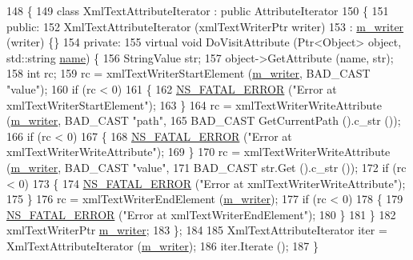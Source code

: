 \begin{DoxyCode}
148 \{
149   \textcolor{keyword}{class }XmlTextAttributeIterator : \textcolor{keyword}{public} AttributeIterator
150   \{
151 \textcolor{keyword}{public}:
152     XmlTextAttributeIterator (xmlTextWriterPtr writer)
153       : \hyperlink{classns3_1_1XmlConfigSave_a838ec47c15d124d23133a8e633c40397}{m\_writer} (writer) \{\}
154 \textcolor{keyword}{private}:
155     \textcolor{keyword}{virtual} \textcolor{keywordtype}{void} DoVisitAttribute (Ptr<Object> \textcolor{keywordtype}{object}, std::string \hyperlink{generate__test__data__lte__spectrum__model_8m_ab74e6bf80237ddc4109968cedc58c151}{name}) \{
156       StringValue str;
157       \textcolor{keywordtype}{object}->GetAttribute (name, str);
158       \textcolor{keywordtype}{int} rc;
159       rc = xmlTextWriterStartElement (\hyperlink{classns3_1_1XmlConfigSave_a838ec47c15d124d23133a8e633c40397}{m\_writer}, BAD\_CAST \textcolor{stringliteral}{"value"});
160       \textcolor{keywordflow}{if} (rc < 0) 
161         \{
162           \hyperlink{group__fatal_ga5131d5e3f75d7d4cbfd706ac456fdc85}{NS\_FATAL\_ERROR} (\textcolor{stringliteral}{"Error at xmlTextWriterStartElement"});
163         \}
164       rc = xmlTextWriterWriteAttribute (\hyperlink{classns3_1_1XmlConfigSave_a838ec47c15d124d23133a8e633c40397}{m\_writer}, BAD\_CAST \textcolor{stringliteral}{"path"},
165                                         BAD\_CAST GetCurrentPath ().c\_str ());
166       \textcolor{keywordflow}{if} (rc < 0) 
167         \{
168           \hyperlink{group__fatal_ga5131d5e3f75d7d4cbfd706ac456fdc85}{NS\_FATAL\_ERROR} (\textcolor{stringliteral}{"Error at xmlTextWriterWriteAttribute"});
169         \}
170       rc = xmlTextWriterWriteAttribute (\hyperlink{classns3_1_1XmlConfigSave_a838ec47c15d124d23133a8e633c40397}{m\_writer}, BAD\_CAST \textcolor{stringliteral}{"value"},
171                                         BAD\_CAST str.Get ().c\_str ());
172       \textcolor{keywordflow}{if} (rc < 0) 
173         \{
174           \hyperlink{group__fatal_ga5131d5e3f75d7d4cbfd706ac456fdc85}{NS\_FATAL\_ERROR} (\textcolor{stringliteral}{"Error at xmlTextWriterWriteAttribute"});
175         \}
176       rc = xmlTextWriterEndElement (\hyperlink{classns3_1_1XmlConfigSave_a838ec47c15d124d23133a8e633c40397}{m\_writer});
177       \textcolor{keywordflow}{if} (rc < 0) 
178         \{
179           \hyperlink{group__fatal_ga5131d5e3f75d7d4cbfd706ac456fdc85}{NS\_FATAL\_ERROR} (\textcolor{stringliteral}{"Error at xmlTextWriterEndElement"});
180         \}
181     \}
182     xmlTextWriterPtr \hyperlink{classns3_1_1XmlConfigSave_a838ec47c15d124d23133a8e633c40397}{m\_writer};
183   \};
184 
185   XmlTextAttributeIterator iter = XmlTextAttributeIterator (\hyperlink{classns3_1_1XmlConfigSave_a838ec47c15d124d23133a8e633c40397}{m\_writer});
186   iter.Iterate ();
187 \}
\end{DoxyCode}
